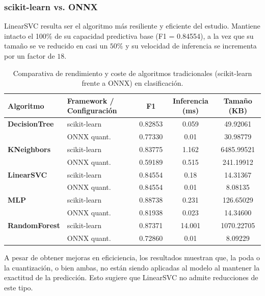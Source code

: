 \documentclass[a4paper,12pt,twoside,final]{book}
\begin{document}
\subsubsection{scikit-learn vs. ONNX}
LinearSVC resulta ser el algoritmo más resiliente y eficiente del estudio. Mantiene intacto el 100\% de su capacidad
predictiva base (F1 = 0.84554), a la vez que su tamaño se ve reducido en casi un $50\%$ y su velocidad de inferencia se
incrementa por un factor de $18$.
\newpage
\begin{table}[htbp]
  \centering
  \begin{tabularx}{\textwidth}{lXccc}
    \hline
    \textbf{Algoritmo} & \textbf{Framework / Configuración} & \textbf{F1} & \textbf{Inferencia (ms)} & \textbf{Tamaño (KB)} \\
    \hline
    \textbf{DecisionTree} & scikit-learn & 0.82853 & 0.059  & 49.92061   \\
                          & ONNX quant.  & 0.77330 & 0.01   & 30.98779   \\
    \hline
    \textbf{KNeighbors}   & scikit-learn & 0.83775 & 1.162  & 6485.99521 \\
                          & ONNX quant.  & 0.59189 & 0.515  & 241.19912  \\
    \hline
    \textbf{LinearSVC}    & scikit-learn & 0.84554 & 0.18   & 14.31367   \\
                          & ONNX quant.  & 0.84554 & 0.01   & 8.08135    \\
    \hline
    \textbf{MLP}          & scikit-learn & 0.88738 & 0.231  & 126.65029  \\
                          & ONNX quant.  & 0.81938 & 0.023  & 14.34600   \\
    \hline
    \textbf{RandomForest} & scikit-learn & 0.87371 & 14.001 & 1070.22705 \\
                          & ONNX quant.  & 0.72860 & 0.01   & 8.09229    \\
    \hline
  \end{tabularx}
  \caption{Comparativa de rendimiento y coste de algoritmos tradicionales (scikit-learn frente a ONNX) en clasificación.}
  \label{tab:sklearn_onnx_clas_resumen}
\end{table}
A pesar de obtener mejoras en eficiciencia, los resultados muestran que, la poda o la
cuantización, o bien ambas, no están siendo aplicadas al modelo al mantener la exactitud de la predicción. Esto sugiere
que LinearSVC no admite reducciones de este tipo.\\
\end{document}
